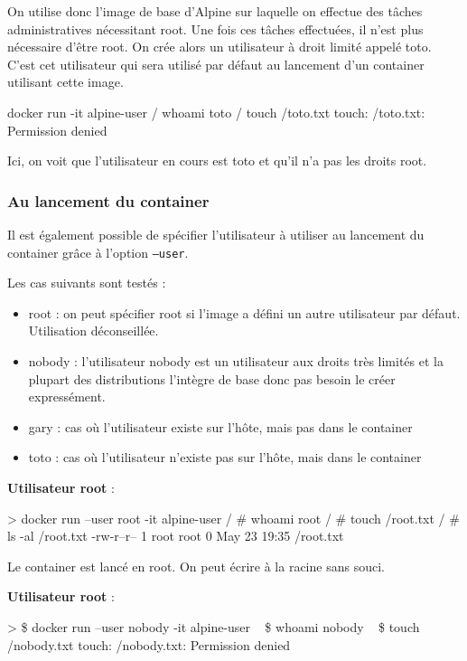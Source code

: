 \documentclass[11pt,a4paper,oneside]{report}
\newcommand{\code}[1]{\texttt{#1}}
\begin{document}
On utilise donc l'image de base d'Alpine sur laquelle on effectue des tâches administratives nécessitant root. Une fois ces tâches effectuées, il n'est plus nécessaire d'être root. On crée alors un utilisateur à droit limité appelé toto. C'est cet utilisateur qui sera utilisé par défaut au lancement d'un container utilisant cette image.

\begin{textcode}
docker run -it alpine-user
/ whoami
toto
/ touch /toto.txt
touch: /toto.txt: Permission denied
\end{textcode}

Ici, on voit que l'utilisateur en cours est toto et qu'il n'a pas les droits root.

\subsubsection{Au lancement du container}
Il est également possible de spécifier l'utilisateur à utiliser au lancement du container grâce à l'option \code{--user}.

Les cas suivants sont testés :
\begin{itemize}
\item root : on peut spécifier root si l'image a défini un autre utilisateur par défaut. Utilisation déconseillée.
\item nobody : l'utilisateur nobody est un utilisateur aux droits très limités et la plupart des distributions l'intègre de base donc pas besoin le créer expressément.
\item gary : cas où l'utilisateur existe sur l'hôte, mais pas dans le container
\item toto : cas où l'utilisateur n'existe pas sur l'hôte, mais dans le container
\end{itemize}

\textbf{Utilisateur root} :
\begin{textcode}
> docker run --user root -it alpine-user
/ # whoami
root
/ # touch /root.txt
/ # ls -al /root.txt
-rw-r--r--    1 root     root             0 May 23 19:35 /root.txt
\end{textcode}

Le container est lancé en root. On peut écrire à la racine sans souci.

\textbf{Utilisateur root} :
\begin{textcode}
> \$ docker run --user nobody -it alpine-user
~ \$ whoami
nobody
~ \$ touch /nobody.txt
touch: /nobody.txt: Permission denied

\end{textcode}
\end{document}
